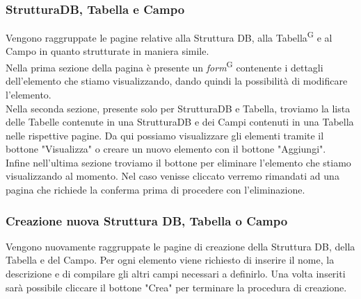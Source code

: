 \documentclass[5pt]{article}
\begin{document}
	    \subsubsection{StrutturaDB, Tabella e Campo}
	    Vengono raggruppate le pagine relative alla Struttura DB, alla Tabella\textsuperscript{G} e al Campo in quanto strutturate in maniera simile.\\
	    Nella prima sezione della pagina è presente un \textit{form}\textsuperscript{G} contenente i dettagli dell'elemento che stiamo visualizzando, dando quindi la possibilità di modificare l'elemento.\\
	    Nella seconda sezione, presente solo per StrutturaDB e Tabella, troviamo la lista delle Tabelle contenute in una StrutturaDB e dei Campi contenuti in una Tabella nelle rispettive pagine. Da qui possiamo visualizzare gli elementi tramite il bottone "Visualizza" o creare un nuovo elemento con il bottone "Aggiungi".\\
	    Infine nell'ultima sezione troviamo il bottone per eliminare l'elemento che stiamo visualizzando al momento. Nel caso venisse cliccato verremo rimandati ad una pagina che richiede la conferma prima di procedere con l'eliminazione.
	    
	    \subsubsection{Creazione nuova Struttura DB, Tabella o Campo}
	    Vengono nuovamente raggruppate le pagine di creazione della Struttura DB, della Tabella e del Campo. Per ogni elemento viene richiesto di inserire il nome, la descrizione e di compilare gli altri campi necessari a definirlo. Una volta inseriti sarà possibile cliccare il bottone "Crea" per terminare la procedura di creazione.
	    
\end{document}
